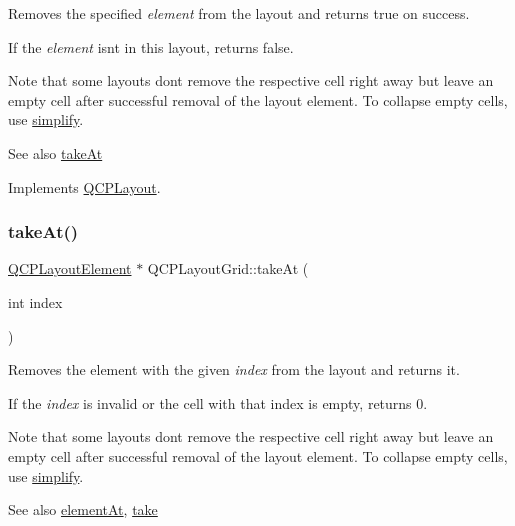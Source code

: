Removes the specified {\itshape element} from the layout and returns true on success.

If the {\itshape element} isn\textquotesingle{}t in this layout, returns false.

Note that some layouts don\textquotesingle{}t remove the respective cell right away but leave an empty cell after successful removal of the layout element. To collapse empty cells, use \mbox{\hyperlink{class_q_c_p_layout_grid_a08bba60e4acd20165526a8fd7f986b58}{simplify}}.

\begin{DoxySeeAlso}{See also}
\mbox{\hyperlink{class_q_c_p_layout_grid_acc1277394ff8a6432e111ff9463e6375}{take\+At}} 
\end{DoxySeeAlso}


Implements \mbox{\hyperlink{class_q_c_p_layout_ada26cd17e56472b0b4d7fbbc96873e4c}{Q\+C\+P\+Layout}}.

\mbox{\label{class_q_c_p_layout_grid_acc1277394ff8a6432e111ff9463e6375}} 
\subsubsection{\texorpdfstring{take\+At()}{takeAt()}}
{\footnotesize\ttfamily \mbox{\hyperlink{class_q_c_p_layout_element}{Q\+C\+P\+Layout\+Element}} $\ast$ Q\+C\+P\+Layout\+Grid\+::take\+At (\begin{DoxyParamCaption}\item[{int}]{index }\end{DoxyParamCaption})\hspace{0.3cm}{\ttfamily [virtual]}}

Removes the element with the given {\itshape index} from the layout and returns it.

If the {\itshape index} is invalid or the cell with that index is empty, returns 0.

Note that some layouts don\textquotesingle{}t remove the respective cell right away but leave an empty cell after successful removal of the layout element. To collapse empty cells, use \mbox{\hyperlink{class_q_c_p_layout_grid_a08bba60e4acd20165526a8fd7f986b58}{simplify}}.

\begin{DoxySeeAlso}{See also}
\mbox{\hyperlink{class_q_c_p_layout_grid_a97672ecc379cb3a09639926ba9980297}{element\+At}}, \mbox{\hyperlink{class_q_c_p_layout_grid_a666a9fe9e92054436f9b66eba25cca0c}{take}} 
\end{DoxySeeAlso}


